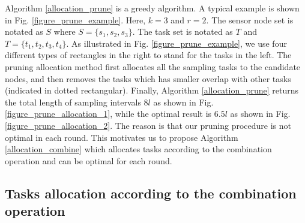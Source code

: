 \documentclass[prodmode,acmtosn]{acmsmall}
\begin{document}
Algorithm \ref{allocation_prune} is a greedy algorithm. A typical  example is shown in Fig. \ref{figure_prune_example}. Here, $k\mathrm{=}3$ and $r\mathrm{=}2$. The sensor node set is notated as $S$ where $S\mathrm{=}\{s_1,s_2,s_3\}$. The task set is notated as $T$ and $T\mathrm{=}\{t_1,t_2,t_3,t_4\}$. As illustrated in Fig. \ref{figure_prune_example}, we use four different types of rectangles in the right to stand for the tasks in the left. The pruning allocation method first allocates all the sampling tasks to the candidate nodes, and then removes the tasks which has smaller overlap with other tasks (indicated in dotted rectangular). Finally, Algorithm \ref{allocation_prune} returns the total length of sampling intervals $8l$ as shown in Fig. \ref{figure_prune_allocation_1}, while the optimal result is $6.5l$ as shown in Fig. \ref{figure_prune_allocation_2}. The reason is that our pruning procedure is not optimal in each round. This motivates us to propose Algorithm \ref{allocation_combine} which allocates tasks according to the combination operation and can be optimal for each round.

\subsection{Tasks allocation according to the combination operation}

\end{document}
